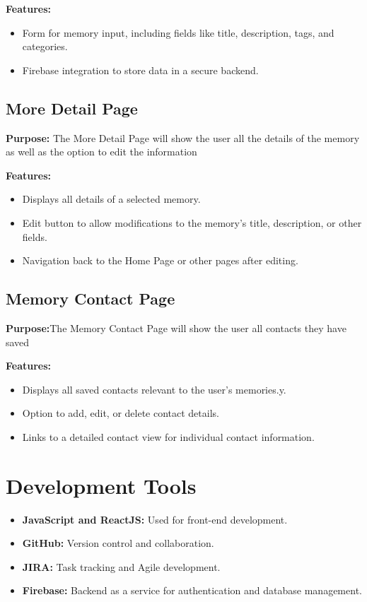 \documentclass[12pt]{article}
\begin{document}
\textbf{Features:}
\begin{itemize}
    \item Form for memory input, including fields like title, description, tags, and categories.
    \item Firebase integration to store data in a secure backend.
\end{itemize}

\subsection{More Detail Page}
\textbf{Purpose:} The More Detail Page will show the user all the details of the memory as well as the option to edit the information

\textbf{Features:}
\begin{itemize}
    \item Displays all details of a selected memory.
    \item Edit button to allow modifications to the memory’s title, description, or other fields.
    \item Navigation back to the Home Page or other pages after editing.
\end{itemize}

\subsection{Memory Contact Page}
\textbf{Purpose:}The Memory Contact Page will show the user all contacts they have saved

\textbf{Features:}
\begin{itemize}
     \item Displays all saved contacts relevant to the user’s memories.y.
    \item Option to add, edit, or delete contact details.
    \item Links to a detailed contact view for individual contact information.
\end{itemize}

\section{Development Tools}
\begin{itemize}
    \item \textbf{JavaScript and ReactJS:} Used for front-end development.
    \item \textbf{GitHub:} Version control and collaboration.
    \item \textbf{JIRA:} Task tracking and Agile development.
    \item \textbf{Firebase:} Backend as a service for authentication and database management.
\end{itemize}
\end{document}
